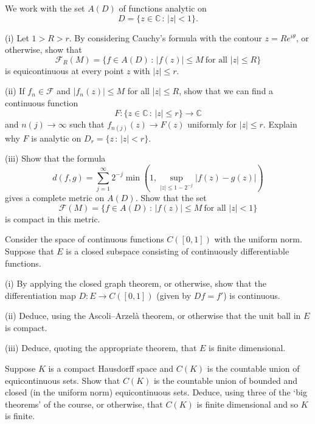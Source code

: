 \begin{exercise}\label{C3.1} 
We work with the set $A(D)$ of functions
analytic on
\[D=\{z\in{\mathbb C}\,:\,|z|<1\}.\]

(i) Let $1>R>r$. By considering Cauchy's formula with the
contour $z=Re^{i\theta}$, or otherwise, show that
\[{\mathcal F}_{R}(M)=
\{f\in A(D)\,:\,|f(z)|\leq M\ \text{for all $|z|\leq R$}\}\]
is equicontinuous at every point $z$ with $|z|\leq r$.

(ii) If $f_{n}\in {\mathcal F}$ and $|f_{n}(z)|\leq M$ for all $|z|\leq R$,
show that we can find a continuous function
\[F:\{z\in{\mathbb C}\,:\,|z|\leq r\}\rightarrow{\mathbb C}\]
and $n(j)\rightarrow\infty$ such that $f_{n(j)}(z)\rightarrow F(z)$
uniformly for $|z|\leq r$. Explain why $F$ is analytic on 
$D_{r}=\{z\,:\,|z|<r\}$.

(iii) Show that the formula
\[d(f,g)=\sum_{j=1}^{\infty}
2^{-j}\min(1,\sup_{|z|\leq 1-2^{-j}}|f(z)-g(z)|)\]
gives a complete metric on $A(D)$.  Show that the set
\[{\mathcal F}(M)=\{f\in A(D)\,:\,|f(z)|\leq M\ \text{for all $|z|<1$}\}\]
is compact in this metric.

\end{exercise}
\begin{exercise}\label{C3.2} Consider the space of continuous functions
$C([0,1])$ with the uniform norm. Suppose that
$E$ is a closed subspace consisting of continuously
differentiable functions.

(i) By applying the closed graph theorem, or otherwise, show that the
differentiation map $D:E\rightarrow  C([0,1])$ 
(given by $Df=f'$) is continuous.


(ii) Deduce, using the  Ascoli--Arzel{\`a} theorem, or otherwise that
the unit ball in $E$  is compact.

(iii) Deduce, quoting the appropriate theorem, that $E$ is finite dimensional.
\end{exercise} 
\begin{exercise}\label{C3.3} Suppose $K$ is a compact Hausdorff space
and $C(K)$ is the countable union of equicontinuous sets.
Show that $C(K)$ is the countable union of 
bounded and closed (in the uniform norm) equicontinuous sets.
Deduce, using three of the `big theorems' of the course,
or otherwise,
that $C(K)$ is finite dimensional and so $K$ is finite.
\end{exercise}
